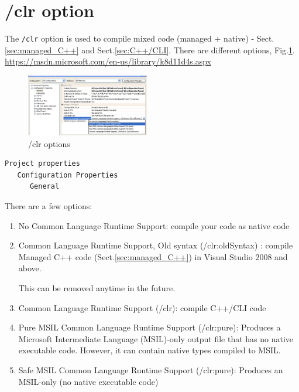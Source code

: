 \section{/clr option}
\label{sec:clr_option}

The \verb!/clr! option is used to compile mixed code (managed + native) -
Sect.\ref{sec:managed_C++} and Sect.\ref{sec:C++/CLI}.
There are different options, Fig.\ref{fig:clr_option}.
\url{https://msdn.microsoft.com/en-us/library/k8d11d4s.aspx}

\begin{figure}[hbt]
  \centerline{\includegraphics[height=2.7cm,
    angle=0]{./images/clr_option.eps}}
\caption{/clr options}
\label{fig:clr_option}
\end{figure}


\begin{verbatim}
Project properties
   Configuration Properties
      General
\end{verbatim}
There are a few options:
\begin{enumerate}
  \item No Common Language Runtime Support: compile your code as native code

  \item Common Language Runtime Support, Old syntax (/clr:oldSyntax) : compile Managed C++ code (Sect.\ref{sec:managed_C++}) in Visual Studio 2008 and above. 
  
  This can be removed anytime in the future.
  
  \item Common Language Runtime Support (/clr): compile C++/CLI code
  
  \item Pure MSIL Common Language Runtime Support (/clr:pure): Produces a Microsoft Intermediate Language (MSIL)-only output file that has no native executable code. However, it can contain native types compiled to MSIL. 
  
  \item Safe MSIL Common Language Runtime Support (/clr:pure): Produces an MSIL-only (no native executable code)
  
\end{enumerate}

